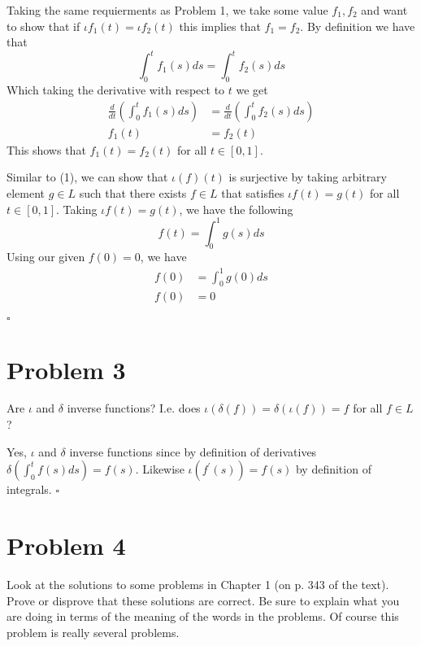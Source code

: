\documentclass[11pt]{article}
\newenvironment{proof}{\noindent{\bf Proof.}}{\hfill $\square$\medskip}
\begin{document}
\begin{proof}
Taking the same requierments as Problem 1, we take some value $f_{1},f_{2}$ and want to show that if 
$\iota f_{1}(t)=\iota f_{2}(t)$ this implies that $f_{1}=f_{2}$. By definition we have that
$$\int_{0}^{t}f_{1}(s)ds=\int_{0}^{t}f_{2}(s)ds$$
Which taking the derivative with respect to $t$ we get
\begin{equation}
    \begin{split}
        \frac{d}{dt}\left(\int_{0}^{t}f_{1}(s)ds\right)&=\frac{d}{dt}\left(\int_{0}^{t}f_{2}(s)ds\right)\\
        f_{1}(t)&=f_{2}(t)
    \end{split}
\end{equation}
This shows that $f_{1}(t)=f_{2}(t)$ for all $t\in[0,1]$.

Similar to (1), we can show that $\iota(f)(t)$ is surjective by taking arbitrary element $g\in L$ such that there exists
$f\in L$ that satisfies $\iota f(t)=g(t)$ for all $t\in[0,1]$. Taking $\iota f(t)=g(t)$, we have the following
$$f(t)=\int_{0}^{1}g(s)ds$$
Using our given $f(0)=0$, we have
\begin{equation}
    \begin{split}
        f(0)&=\int_{0}^{1}g(0)ds\\
        f(0)&=0
    \end{split}
\end{equation}


\end{proof}

\newpage
\section{Problem 3}
Are $\iota$ and $\delta$ inverse functions? I.e. does $\iota(\delta(f))=\delta(\iota(f))=f$ for all $f\in L$?

\begin{proof}
Yes, $\iota$ and $\delta$ inverse functions since by definition of derivatives $\delta(\int_{0}^{t}f(s)ds)=f(s)$.
Likewise $\iota(f^{\prime}(s))=f(s)$ by definition of integrals.
\end{proof}

\section{Problem 4}
Look at the solutions to some problems in Chapter 1 (on p. 343 of the text).
Prove or disprove that these solutions are correct. Be sure to explain what you are doing in terms of the meaning of the words
in the problems. Of course this problem is really several problems.
\end{document}
